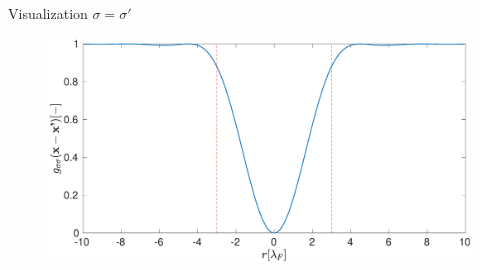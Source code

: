 \begin{frame}{Visualization $\sigma = \sigma'$}
\begin{figure}
\includegraphics[width=\textwidth]{images/Density}
\end{figure}
\end{frame}